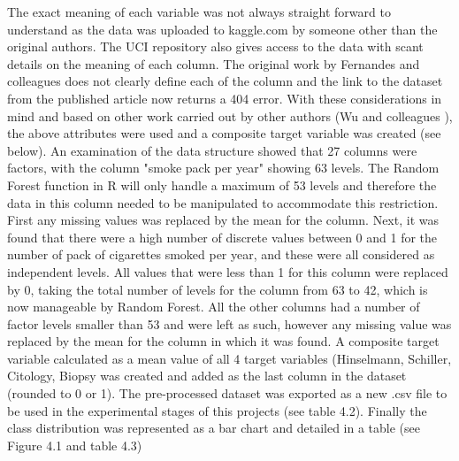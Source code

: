 The exact meaning of each variable was not always straight forward to understand as the data was uploaded to kaggle.com by someone other than the original authors. The UCI repository also gives access to the data with scant details on the meaning of each column. The original work by Fernandes and colleagues \citep{Fernandes:2017td} does not clearly define each of the column and the link to the dataset from the published article now returns a 404 error. With these considerations in mind and based on other work carried out by other authors (Wu and colleagues \citep{Wu:2017fa}), the above attributes were used and a composite target variable was created (see below).\newline
An examination of the data structure showed that 27 columns were factors, with the column "smoke pack per year" showing 63 levels. The Random Forest function in R will only handle a maximum of 53 levels and therefore the data in this column needed to be manipulated to accommodate this restriction. \newline
First any missing values was replaced by the mean for the column. Next, it was found that there were a high number of discrete values between 0 and 1 for the number of pack of cigarettes smoked per year, and these were all considered as independent levels. All values that were less than 1 for this column were replaced by 0, taking the total number of levels for the column from 63 to 42, which is now manageable by Random Forest.\newline
All the other columns had a number of factor levels smaller than 53 and were left as such, however any missing value was replaced by the mean for the column in which it was found.\newline
A composite target variable calculated as a mean value of all 4 target variables (Hinselmann, Schiller, Citology, Biopsy was created and added as the last column in the dataset (rounded to 0 or 1).\newline
The pre-processed dataset was exported as a new .csv file to be used in the experimental stages of this projects (see table 4.2).
Finally the class distribution was represented as a bar chart and detailed in a table (see Figure 4.1 and table 4.3) 

